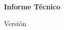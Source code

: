 \begin{titlepage}

\centering

\vspace*{2.5cm}

{\Huge\bfseries \TituloCaso\par}

\vspace{0.6cm}

{\Large \SubtituloCaso\par}

\vspace{1.5cm}

{\Large\textbf{Informe Técnico}}

\vfill

{\Large \Autor\par}

\vspace{0.3cm}

{\large \Empresa\par}

\vspace{0.3cm}

{\large \Fecha\par}

\vfill

Versión \Version

\end{titlepage}
